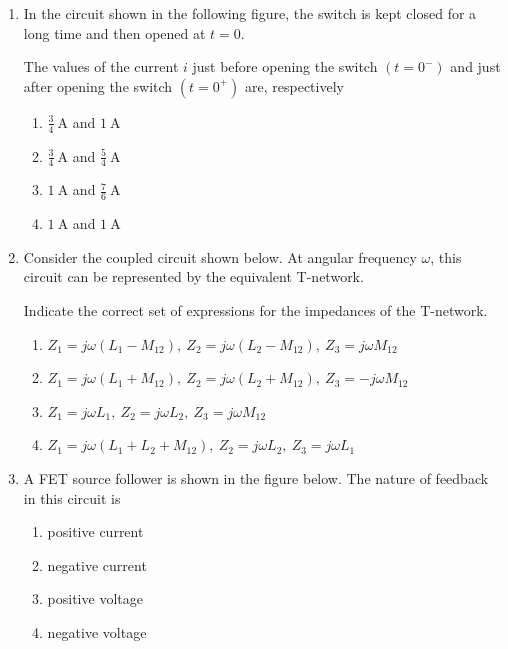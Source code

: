 \documentclass[journal]{IEEEtran}
\begin{document}
\begin{enumerate}
\item In the circuit shown in the following figure, the switch is kept closed for a long time and then opened at $t=0$.  

The values of the current $i$ just before opening the switch $(t=0^-)$ and just after opening the switch $(t=0^+)$ are, respectively

\begin{multicols}{4}
\begin{enumerate}
\item $\tfrac{3}{4}\ \mathrm{A}$ and $1\ \mathrm{A}$  
\item $\tfrac{3}{4}\ \mathrm{A}$ and $\tfrac{5}{4}\ \mathrm{A}$  
\item $1\ \mathrm{A}$ and $\tfrac{7}{6}\ \mathrm{A}$  
\item $1\ \mathrm{A}$ and $1\ \mathrm{A}$  
\end{enumerate}
\end{multicols}

\item Consider the coupled circuit shown below. At angular frequency $\omega$, this circuit can be represented by the equivalent T-network.  

Indicate the correct set of expressions for the impedances of the T-network.

\begin{multicols}{4}
\begin{enumerate}
\item $Z_1 = j\omega(L_1 - M_{12}),\ Z_2 = j\omega(L_2 - M_{12}),\ Z_3 = j\omega M_{12}$  
\item $Z_1 = j\omega(L_1+M_{12}),\ Z_2 = j\omega(L_2+M_{12}),\ Z_3 = -j\omega M_{12}$  
\item $Z_1 = j\omega L_1,\ Z_2 = j\omega L_2,\ Z_3 = j\omega M_{12}$  
\item $Z_1 = j\omega(L_1+L_2+M_{12}),\ Z_2 = j\omega L_2,\ Z_3 = j\omega L_1$  
\end{enumerate}
\end{multicols}

\item A FET source follower is shown in the figure below. The nature of feedback in this circuit is  

\begin{enumerate}
\item positive current  
\item negative current  
\item positive voltage  
\item negative voltage  
\end{enumerate}


\end{enumerate}
\end{document}
